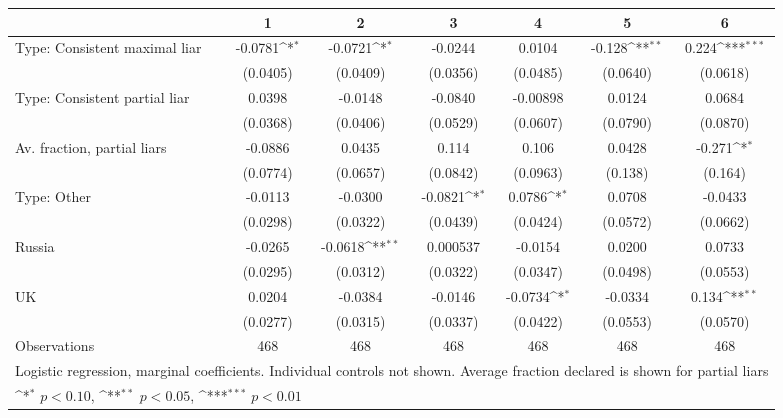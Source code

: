 {
\def\sym#1{\ifmmode^{#1}\else\(^{#1}\)\fi}
\begin{tabular}{l*{6}{c}}
\hline\hline
                &\multicolumn{1}{c}{1}&\multicolumn{1}{c}{2}&\multicolumn{1}{c}{3}&\multicolumn{1}{c}{4}&\multicolumn{1}{c}{5}&\multicolumn{1}{c}{6}\\
\hline
Type: Consistent maximal liar&  -0.0781\sym{*}  &  -0.0721\sym{*}  &  -0.0244         &   0.0104         &   -0.128\sym{**} &    0.224\sym{***}\\
                & (0.0405)         & (0.0409)         & (0.0356)         & (0.0485)         & (0.0640)         & (0.0618)         \\
Type: Consistent partial liar&   0.0398         &  -0.0148         &  -0.0840         & -0.00898         &   0.0124         &   0.0684         \\
                & (0.0368)         & (0.0406)         & (0.0529)         & (0.0607)         & (0.0790)         & (0.0870)         \\
Av. fraction, partial liars&  -0.0886         &   0.0435         &    0.114         &    0.106         &   0.0428         &   -0.271\sym{*}  \\
                & (0.0774)         & (0.0657)         & (0.0842)         & (0.0963)         &  (0.138)         &  (0.164)         \\
Type: Other     &  -0.0113         &  -0.0300         &  -0.0821\sym{*}  &   0.0786\sym{*}  &   0.0708         &  -0.0433         \\
                & (0.0298)         & (0.0322)         & (0.0439)         & (0.0424)         & (0.0572)         & (0.0662)         \\
Russia          &  -0.0265         &  -0.0618\sym{**} & 0.000537         &  -0.0154         &   0.0200         &   0.0733         \\
                & (0.0295)         & (0.0312)         & (0.0322)         & (0.0347)         & (0.0498)         & (0.0553)         \\
UK              &   0.0204         &  -0.0384         &  -0.0146         &  -0.0734\sym{*}  &  -0.0334         &    0.134\sym{**} \\
                & (0.0277)         & (0.0315)         & (0.0337)         & (0.0422)         & (0.0553)         & (0.0570)         \\
\hline
Observations    &      468         &      468         &      468         &      468         &      468         &      468         \\
\hline\hline
\multicolumn{7}{l}{\footnotesize Logistic regression, marginal coefficients. Individual controls not shown. Average fraction declared is shown for partial liars}\\
\multicolumn{7}{l}{\footnotesize \sym{*} \(p<0.10\), \sym{**} \(p<0.05\), \sym{***} \(p<0.01\)}\\
\end{tabular}
}
